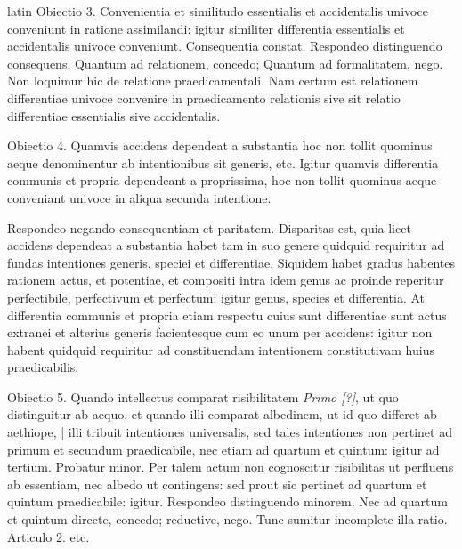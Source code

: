 \begin{otherlanguage*}{latin}
\pstart
 Obiectio 3. Convenientia et similitudo essentialis et accidentalis univoce conveniunt in ratione  assimilandi: igitur similiter differentia essentialis et accidentalis univoce conveniunt. Consequentia constat. Respondeo distinguendo consequens. Quantum ad relationem, concedo; Quantum ad formalitatem, nego. Non loquimur hic de relatione praedicamentali. Nam certum est relationem differentiae univoce convenire in praedicamento relationis sive sit relatio differentiae essentialis sive accidentalis. 
\pend

\pstart
 Obiectio 4. Quamvis accidens dependeat a substantia hoc non tollit quominus aeque denominentur ab intentionibus sit generis, etc. Igitur quamvis differentia communis et propria dependeant a proprissima, hoc non tollit quominus aeque conveniant univoce in aliqua secunda intentione. 
\pend

\pstart
 Respondeo negando consequentiam et paritatem. Disparitas est, quia licet accidens dependeat a substantia habet tam in suo genere quidquid requiritur ad fundas intentiones generis, speciei et differentiae. Siquidem habet gradus habentes rationem actus, et potentiae, et compositi intra idem genus ac proinde reperitur perfectibile, perfectivum et perfectum: igitur genus, species et differentia. At differentia communis et propria etiam respectu cuius sunt differentiae sunt actus extranei et alterius generis facientesque cum eo unum per accidens: igitur non habent quidquid requiritur ad constituendam intentionem constitutivam huius praedicabilis. 
\pend

\pstart
 Obiectio 5. Quando intellectus comparat risibilitatem \emph{Primo [?]}, ut quo distinguitur ab aequo, et quando illi comparat albedinem, ut id quo differet ab aethiope, \textnormal{|}   illi tribuit intentiones universalis, sed tales intentiones non pertinet ad primum et secundum praedicabile, nec etiam ad quartum et quintum: igitur ad tertium. Probatur minor. Per talem actum non cognoscitur risibilitas ut perfluens ab essentiam, nec albedo ut contingens: sed prout sic pertinet ad quartum et quintum praedicabile: igitur. Respondeo distinguendo minorem. Nec  ad quartum et quintum directe, concedo; reductive, nego. Tunc sumitur incomplete illa ratio. Articulo 2. etc. 
\pend

        \pstart
        \pend
      

\end{otherlanguage*}

